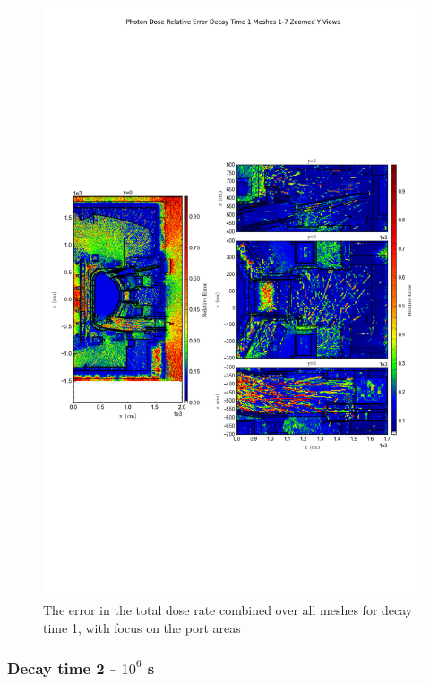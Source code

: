 \documentclass[12pt]{article}
\begin{document}
\begin{figure}[ht!]
\centering
\includegraphics[trim={0cm 9cm 0cm 10cm},clip,scale=0.75]{../plots/final_model_with_b4c/Photon_Dose_Relative_Error_Decay_Time_1_Meshes_1-7_Zoomed_Y_Views.png}
\caption{The error in the total dose rate combined over all meshes for decay time 1, with focus on the port areas}
\label{fig:photons_dc1_b4c_total_error_zoomed}

\end{figure}

\clearpage
\subsubsection{Decay time 2 - $10^6$ s}
\end{document}
